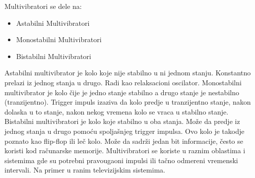 \documentclass[12pt,a4paper]{article}
\begin{document}
Multivibratori se dele na:
\begin{itemize}
  \item Astabilni Multivibratori
  \item Monostabilni Multivibratori
  \item Bistabilni Multivibratori
\end{itemize}
Astabilni multivibrator je kolo koje nije stabilno u ni jednom stanju. 
Konstantno prelazi iz jednog stanja u drugo. Radi kao relaksacioni oscilator. 
\newline
Monostabilni multivibrator je kolo čije je jedno stanje stabilno a drugo stanje je nestabilno (tranzijentno). Trigger impuls izaziva da kolo predje u tranzijentno stanje, nakon dolaska u to stanje, nakon nekog vremena kolo se vraca u stabilno stanje. 
\newline
Bistabilni multivibratori je kolo koje stabilno u oba stanja. Može da predje iz jednog stanja u drugo pomoću spoljašnjeg trigger impulsa. Ovo kolo je takodje poznato kao flip-flop ili leč kolo. Može da sadrži jedan bit informacije, često se koristi kod računarske memorije. 
Multivibratori se koriste u raznim oblastima i sistemima gde su potrebni pravougaoni impulsi ili tačno odmereni vremenski intervali. Na primer u ranim televizijskim sistemima.
\newpage
\noindent\makebox[\linewidth]{\rule{0.8\paperwidth}{.4pt}}
\end{document}
